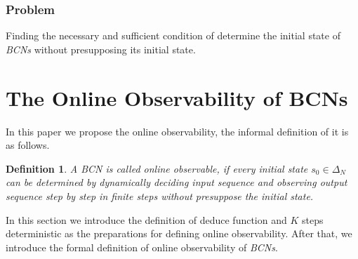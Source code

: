 \documentclass[conference]{IEEEtran} %
\newtheorem{definition}{Definition}
\newcommand{\tl}[1]{\textcolor{blue} {TL: #1 :TL} }
\begin{document}
 \subsubsection*{Problem}
Finding the necessary and sufficient condition of determine the initial state of {\em BCNs} without presupposing its initial state.

\section{The Online Observability of BCNs}
In this paper we propose the online observability, the informal definition of it is as follows. 

\begin{definition}
	A {\em BCN} is called online observable, if every initial state $s_0 \in \Delta_N$ can be determined by dynamically deciding input sequence and observing output sequence step by step in finite steps without presuppose the  initial state.
\end{definition}


In this section we introduce the definition of deduce function and $K$ steps deterministic as the preparations for defining online observability. After that, we introduce the formal definition of online observability of {\em BCNs}. 
\end{document}
